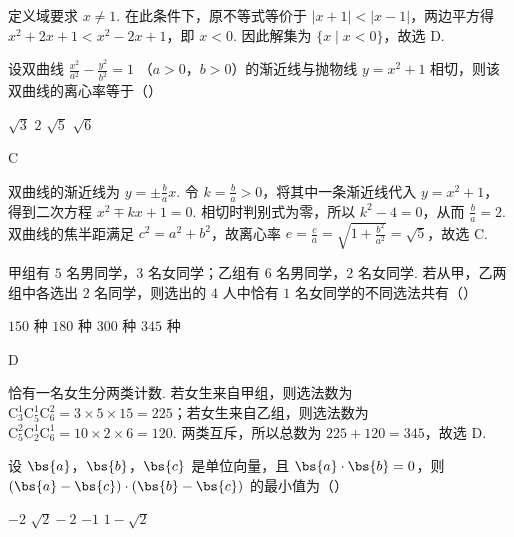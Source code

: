 \begin{solution}
定义域要求 \(x\ne1\). 在此条件下，原不等式等价于
\(\lvert x+1\rvert<\lvert x-1\rvert\)，两边平方得
\(x^2+2x+1<x^2-2x+1\)，即 \(x<0\). 因此解集为
\(\{x\mid x<0\}\)，故选 D.
\end{solution}

\begin{problem}
设双曲线 \(\frac{x^2}{a^2} - \frac{y^2}{b^2} = 1 \) （\(a > 0\)，\(b > 0\)）的渐近线与抛物线 \(y = x^2 + 1\) 相切，则该双曲线的离心率等于（\quad）

\choices
    {\(\sqrt{3}\)}
    {\(2\)}
    {\(\sqrt{5}\)}
    {\(\sqrt{6}\)}
\end{problem}

\begin{answer}
C
\end{answer}

\begin{solution}
双曲线的渐近线为 \(y=\pm\frac{b}{a}x\). 令 \(k=\frac{b}{a}>0\)，将其中一条渐近线代入
\(y=x^2+1\)，得到二次方程 \(x^2\mp kx+1=0\). 相切时判别式为零，所以
\(k^2-4=0\)，从而 \(\frac{b}{a}=2\). 双曲线的焦半距满足
\(c^2=a^2+b^2\)，故离心率
\(e=\frac{c}{a}=\sqrt{1+\frac{b^2}{a^2}}=\sqrt5\)，故选 C.
\end{solution}

\begin{problem}
甲组有 \(5\text{ 名}\)男同学，\(3\text{ 名}\)女同学；乙组有 \(6\text{ 名}\)男同学，\(2\text{ 名}\)女同学. 若从甲，乙两组中各选出 \(2\text{ 名}\)同学，则选出的 \(4\text{ 人}\)中恰有 \(1\text{ 名}\)女同学的不同选法共有（\quad）

\choices
    {\(150\text{ 种}\)}
    {\(180\text{ 种}\)}
    {\(300\text{ 种}\)}
    {\(345\text{ 种}\)}
\end{problem}

\begin{answer}
D
\end{answer}

\begin{solution}
恰有一名女生分两类计数. 若女生来自甲组，则选法数为
\(\mathrm C_3^1\mathrm C_5^1\mathrm C_6^2=3\times5\times15=225\)；若女生来自乙组，则选法数为
\(\mathrm C_5^2\mathrm C_2^1\mathrm C_6^1=10\times2\times6=120\). 两类互斥，所以总数为
\(225+120=345\)，故选 D.
\end{solution}

\begin{problem}
设 \(\bs{a}\)，\(\bs{b}\)，\(\bs{c}\) 是单位向量，且 \(\bs{a} \cdot \bs{b} = 0\)，则 \(\left(\bs{a} - \bs{c}\right) \cdot \left(\bs{b} - \bs{c}\right)\) 的最小值为（\quad）

\choices
    {\(-2\)}
    {\(\sqrt{2} - 2\)}
    {\(-1\)}
    {\(1 - \sqrt{2}\)}
\end{problem}

